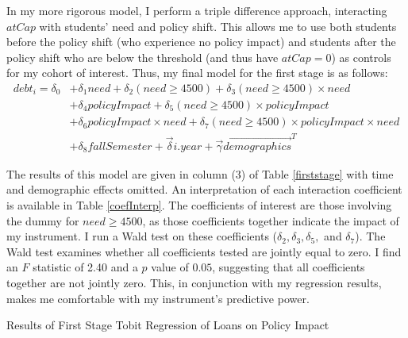 \documentclass[12pt]{article}
\newcommand{\regs}{../Analysis/Regressions/Output/}
\begin{document}
	In my more rigorous model, I perform a triple difference approach, interacting $atCap$ with students' need and policy shift. This allows me to use both students before the policy shift (who experience no policy impact) and students after the policy shift who are below the threshold (and thus have $atCap = 0$) as controls for my cohort of interest. Thus, my final model for the first stage is as follows: 
	\begin{equation}
	\begin{aligned}
	debt_i = \delta_0 &+ \delta_1 need + \delta_2 (need \geq 4500) + \delta_3 (need \geq 4500) \times need \\ 
	&+ \delta_4 policyImpact + \delta_5 (need \geq 4500) \times policyImpact \\
	&+ \delta_6 policyImpact \times need + \delta_7 (need \geq 4500) \times policyImpact \times need \\
	&+ \delta_8 fallSemester + \vec{\delta} i.year + \vec{\gamma} \vec{demographics}^T
	 \end{aligned}
	 \end{equation} 
	 
	 The results of this model are given in column (3) of Table \ref{firststage} with time and demographic effects omitted. An interpretation of each interaction coefficient is available in Table \ref{coefInterp}. The coefficients of interest are those involving the dummy for $need \geq 4500$, as those coefficients together indicate the impact of my instrument. I run a Wald test on these coefficients ($\delta_2, \delta_3, \delta_5,$ and $\delta_7$). The Wald test examines whether all coefficients tested are jointly equal to zero. I find an $F$ statistic of 2.40 and a $p$ value of $0.05$, suggesting that all coefficients together are not jointly zero. This, in conjunction with my regression results, makes me comfortable with my instrument's predictive power.
	 
	 \begin{table}
	 	\centering
	 	\caption{Results of First Stage Tobit Regression of Loans on Policy Impact}	 
	 	\resizebox{\textwidth}{!}{	
		 	
		 }
	 	\label{firststage}
	 \end{table}
	
\end{document}
